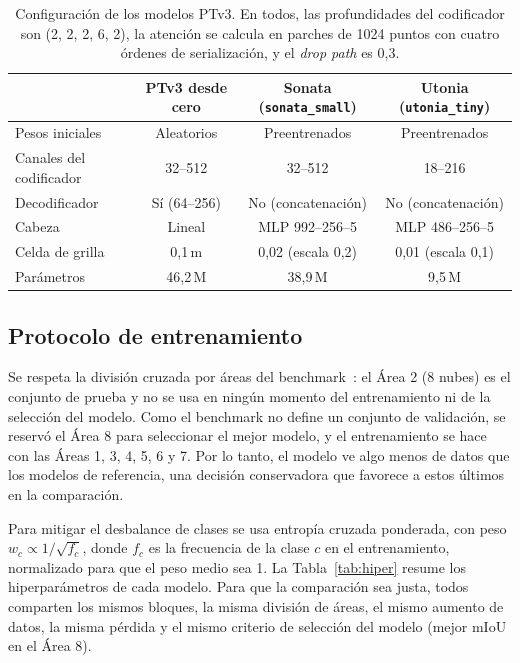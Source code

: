 \documentclass[5p]{elsarticle}
\begin{document}
\begin{table}[t]
\centering
\caption{Configuración de los modelos PTv3. En todos, las profundidades del codificador son (2, 2, 2, 6, 2), la atención se calcula en parches de 1024 puntos con cuatro órdenes de serialización, y el \emph{drop path} es 0,3.}\label{tab:ptv3}
\footnotesize
\setlength{\tabcolsep}{4pt}
\begin{tabular}{@{}lccc@{}}
\toprule
 & PTv3 desde cero & Sonata (\texttt{sonata\_small}) & Utonia (\texttt{utonia\_tiny}) \\
\midrule
Pesos iniciales & Aleatorios & Preentrenados & Preentrenados \\
Canales del codificador & 32--512 & 32--512 & 18--216 \\
Decodificador & Sí (64--256) & No (concatenación) & No (concatenación) \\
Cabeza & Lineal & MLP 992--256--5 & MLP 486--256--5 \\
Celda de grilla & 0,1\,m & 0,02 (escala 0,2) & 0,01 (escala 0,1) \\
Parámetros & 46,2\,M & 38,9\,M & 9,5\,M \\
\bottomrule
\end{tabular}
\end{table}

\subsection{Protocolo de entrenamiento}

Se respeta la división cruzada por áreas del benchmark~\cite{Le2026}: el Área 2 (8 nubes) es el conjunto de prueba y no se usa en ningún momento del entrenamiento ni de la selección del modelo. Como el benchmark no define un conjunto de validación, se reservó el Área 8 para seleccionar el mejor modelo, y el entrenamiento se hace con las Áreas 1, 3, 4, 5, 6 y 7. Por lo tanto, el modelo ve algo menos de datos que los modelos de referencia, una decisión conservadora que favorece a estos últimos en la comparación.

Para mitigar el desbalance de clases se usa entropía cruzada ponderada, con peso $w_c \propto 1/\sqrt{f_c}$, donde $f_c$ es la frecuencia de la clase $c$ en el entrenamiento, normalizado para que el peso medio sea 1. La Tabla~\ref{tab:hiper} resume los hiperparámetros de cada modelo. Para que la comparación sea justa, todos comparten los mismos bloques, la misma división de áreas, el mismo aumento de datos, la misma pérdida y el mismo criterio de selección del modelo (mejor mIoU en el Área 8).
\end{document}

